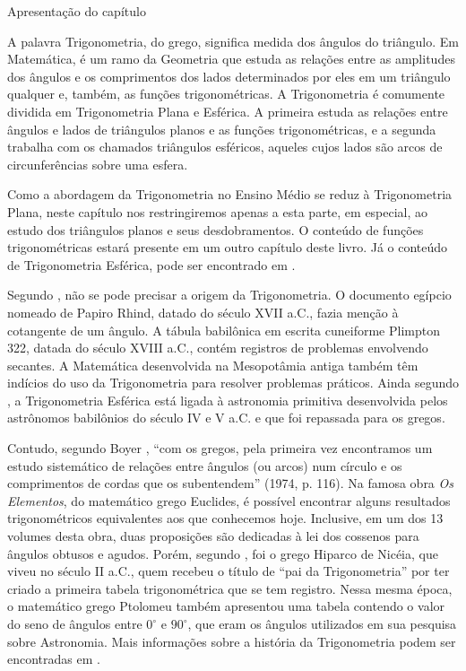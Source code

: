 \mainmatter

\begin{apresentacao}{Apresentação do capítulo}

A palavra Trigonometria, do grego, significa medida dos ângulos do triângulo.
%
Em Matemática, é um ramo da Geometria que estuda as relações entre as amplitudes dos ângulos e os comprimentos dos lados determinados por eles em um triângulo qualquer e, também, as funções trigonométricas. 
%
A Trigonometria é comumente dividida em Trigonometria Plana e Esférica. 
%
A primeira estuda as relações entre ângulos e lados de triângulos planos e as funções trigonométricas, e a segunda trabalha com os chamados triângulos esféricos, aqueles cujos lados são arcos de circunferências sobre uma esfera. 

Como a abordagem da Trigonometria no Ensino Médio se reduz à Trigonometria Plana, neste capítulo nos restringiremos apenas a esta parte, em especial, ao estudo dos triângulos planos e seus desdobramentos. 
%
O conteúdo de funções trigonométricas estará presente em um outro capítulo deste livro. 
%
Já o conteúdo de Trigonometria Esférica, pode ser encontrado em \cite{coutinho2001}. 

Segundo \citet{eves1995}, não se pode precisar a origem da Trigonometria.
%
O documento egípcio nomeado de Papiro Rhind, datado do século XVII a.C., fazia menção à cotangente de um ângulo. 
%
A tábula babilônica em escrita cuneiforme Plimpton 322, datada do século XVIII a.C., contém registros de problemas envolvendo secantes. 
%
A Matemática desenvolvida na Mesopotâmia antiga também têm indícios do uso da Trigonometria para resolver problemas práticos.
%
Ainda segundo \citeauthor{eves1995}, a Trigonometria Esférica está ligada à astronomia primitiva desenvolvida pelos astrônomos babilônios do século IV e V a.C. e que foi repassada para os gregos.

Contudo, segundo Boyer \citeauthor{boyer1974}, ``com os gregos, pela primeira vez encontramos um estudo sistemático de relações entre ângulos (ou arcos) num círculo e os comprimentos de cordas que os subentendem'' \cite[p. 116]{boyer1974}(1974, p. 116).
%
Na famosa obra \textit{Os Elementos}, do matemático grego Euclides, é possível encontrar alguns resultados trigonométricos equivalentes aos que conhecemos hoje. 
%
Inclusive, em um dos 13 volumes desta obra, duas proposições são dedicadas à lei dos cossenos para ângulos obtusos e agudos. 
%
Porém, segundo \citeauthor{eves1995}, foi o grego Hiparco de Nicéia, que viveu no século II a.C., quem recebeu o título de ``pai da Trigonometria'' por ter criado a primeira tabela trigonométrica que se tem registro. 
%
Nessa mesma época, o matemático grego Ptolomeu também apresentou uma tabela contendo o valor do seno de ângulos entre $0^\circ$ e $90^\circ$, que eram os ângulos utilizados em sua pesquisa sobre Astronomia. 
%
Mais informações sobre a história da Trigonometria podem ser encontradas em \cite{eves1995,boyer1974,roque2012}. 


\end{apresentacao}
